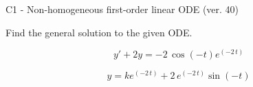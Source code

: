\begin{exercise}
  \begin{exerciseTitle}C1 - Non-homogeneous first-order linear ODE (ver. 40)\end{exerciseTitle}
  \begin{exerciseStatement}
    
Find the general solution to the given ODE.

    
\[y'+2y= -2 \, \cos\left(-t\right) e^{\left(-2 \, t\right)}\]

  \end{exerciseStatement}
  \begin{exerciseAnswer}
    
\[y= k e^{\left(-2 \, t\right)} + 2 \, e^{\left(-2 \, t\right)} \sin\left(-t\right)\]

  \end{exerciseAnswer}
\end{exercise}